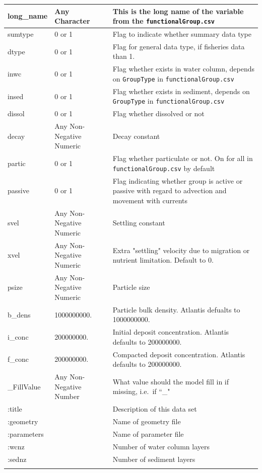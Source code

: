 \documentclass{report}
\begin{document}
\begin{center}
\begin{longtable}{llp{8cm}}
\hline
long\_name & Any Character & This is the long name of the variable from the \texttt{functionalGroup.csv} \\
\hline
sumtype & 0 or 1  & Flag to indicate whether summary data type  \\
\hline
dtype & 0 or 1 & Flag for general data type, if fisheries data than 1. \\
\hline
inwc & 0 or 1 & Flag whether exists in water column, depends on \texttt{GroupType} in \texttt{functionalGroup.csv} \\
\hline
insed & 0 or 1 & Flag whether exists in sediment, depends on \texttt{GroupType} in \texttt{functionalGroup.csv} \\
\hline
dissol & 0 or 1 & Flag whether dissolved or not \\
\hline
decay & Any Non-Negative Numeric & Decay constant \\
\hline 
partic & 0 or 1 & Flag whether particulate or not. On for all in \texttt{functionalGroup.csv} by default \\
\hline 
passive & 0 or 1 & Flag indicating whether group is active or passive with regard to advection and movement with currents \\
\hline
svel & Any Non-Negative Numeric & Settling constant \\ 
\hline
xvel & Any Non-Negative Numeric & Extra "settling" velocity due to migration or nutrient limitation. Default to 0. \\
\hline
psize & Any Non-Negative Numeric & Particle size \\
\hline
b\_dens & 1000000000. & Particle bulk density. Atlantis defualts to 1000000000. \\
\hline
i\_conc & 200000000. & Initial deposit concentration. Atlantis defaults to 200000000. \\
\hline
f\_conc & 200000000. & Compacted deposit concentration. Atlantis defaults to 200000000. \\
\hline
\_FillValue & Any Non-Negative Number & What value should the model fill in if missing, i.e.\ if  ``\_" \\
\hline
:title & &  Description of this data set \\
\hline
:geometry  & & Name of geometry file \\
\hline
:parameters  & & Name of parameter file \\
\hline
:wcnz & & Number of water column layers \\
\hline
:sednz & & Number of sediment layers \\
\hline
\label{tab:init}
\end{longtable}
\end{center}
\end{document}
